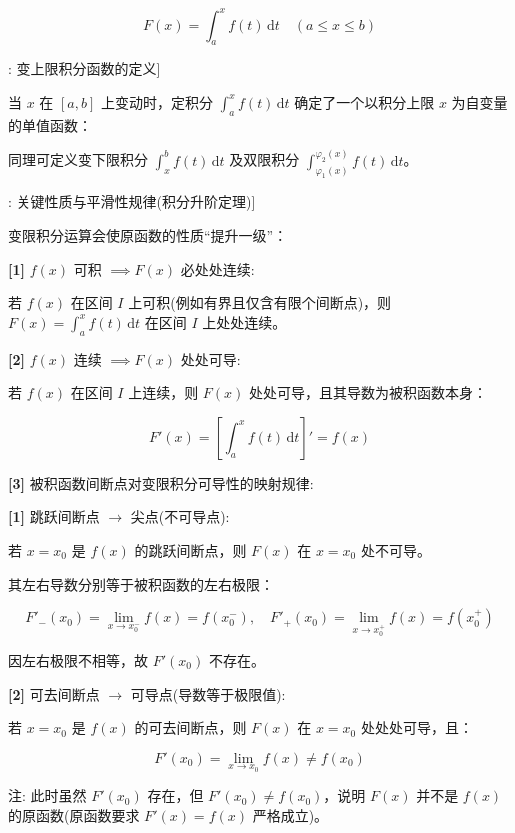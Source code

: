 \documentclass[11pt,a4paper,UTF8]{ctexart}
\begin{document}
\begin{equation*}
F(x) = \int_a^x f(t)\,\mathrm{d}t \quad (a \leqslant x \leqslant b)
\end{equation*}
\begin{thmbox}[概念[1]: 变上限积分函数的定义]

当 $x$ 在 $[a, b]$ 上变动时，定积分 $\int_a^x f(t)\,\mathrm{d}t$ 确定了一个以积分上限 $x$ 为自变量的单值函数：


同理可定义变下限积分 $\int_x^b f(t)\,\mathrm{d}t$ 及双限积分 $\int_{\varphi_1(x)}^{\varphi_2(x)} f(t)\,\mathrm{d}t$。

\end{thmbox}
\begin{thmbox}[定理[1]: 关键性质与平滑性规律(积分升阶定理)]

变限积分运算会使原函数的性质“提升一级”：

\textbf{[1]} $f(x)$ 可积 $\implies F(x)$ 必处处连续:

若 $f(x)$ 在区间 $I$ 上可积(例如有界且仅含有限个间断点)，则 $F(x) = \int_a^x f(t)\,\mathrm{d}t$ 在区间 $I$ 上处处连续。

\textbf{[2]} $f(x)$ 连续 $\implies F(x)$ 处处可导:

若 $f(x)$ 在区间 $I$ 上连续，则 $F(x)$ 处处可导，且其导数为被积函数本身：


\begin{equation*}
F'(x) = \left[ \int_a^x f(t)\,\mathrm{d}t \right]' = f(x)
\end{equation*}


\textbf{[3]} 被积函数间断点对变限积分可导性的映射规律:

\textbf{[1]} 跳跃间断点 $\to$ 尖点(不可导点):

若 $x = x_0$ 是 $f(x)$ 的跳跃间断点，则 $F(x)$ 在 $x = x_0$ 处不可导。

其左右导数分别等于被积函数的左右极限：


\begin{equation*}
F'_-(x_0) = \lim_{x \to x_0^-} f(x) = f(x_0^-), \quad F'_+(x_0) = \lim_{x \to x_0^+} f(x) = f(x_0^+)
\end{equation*}


因左右极限不相等，故 $F'(x_0)$ 不存在。

\textbf{[2]} 可去间断点 $\to$ 可导点(导数等于极限值):

若 $x = x_0$ 是 $f(x)$ 的可去间断点，则 $F(x)$ 在 $x = x_0$ 处处处可导，且：


\begin{equation*}
F'(x_0) = \lim_{x \to x_0} f(x) \neq f(x_0)
\end{equation*}


注: 此时虽然 $F'(x_0)$ 存在，但 $F'(x_0) \neq f(x_0)$，说明 $F(x)$ 并不是 $f(x)$ 的原函数(原函数要求 $F'(x) = f(x)$ 严格成立)。

\end{thmbox}
\end{document}
